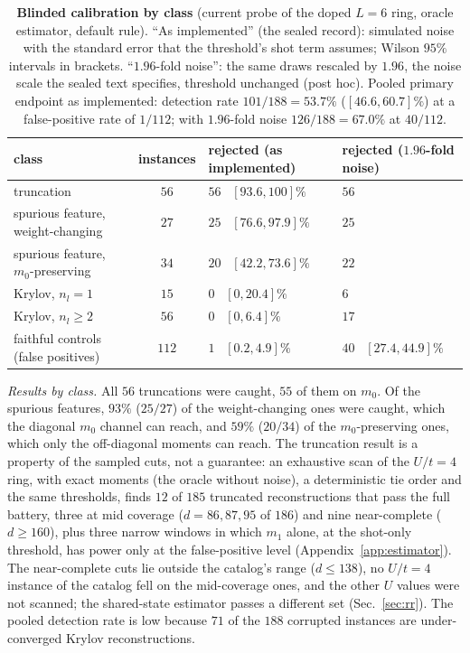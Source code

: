 \documentclass[submission, PhysCore]{SciPost}
\begin{document}
\begin{table}[t]
\caption{\label{tab:blind}\textbf{Blinded calibration by class} (current probe of the doped $L=6$ ring, oracle estimator, default rule). ``As implemented'' (the sealed record): simulated noise with the standard error that the threshold's shot term assumes; Wilson $95\%$ intervals in brackets. ``$1.96$-fold noise'': the same draws rescaled by $1.96$, the noise scale the sealed text specifies, threshold unchanged (post hoc). Pooled primary endpoint as implemented: detection rate $101/188=53.7\%$ ($[46.6,60.7]\%$) at a false-positive rate of $1/112$; with $1.96$-fold noise $126/188=67.0\%$ at $40/112$.}
\small
\begin{tabular}{>{\raggedright\arraybackslash}p{}c>{\raggedright\arraybackslash}p{}>{\raggedright\arraybackslash}p{}}
\toprule
class & instances & rejected (as implemented) & rejected ($1.96$-fold noise) \tabularnewline
\midrule
truncation & $56$ & $56$ \ $[93.6,100]\%$ & $56$ \tabularnewline
spurious feature, weight-changing & $27$ & $25$ \ $[76.6,97.9]\%$ & $25$ \tabularnewline
spurious feature, $m_0$-preserving & $34$ & $20$ \ $[42.2,73.6]\%$ & $22$ \tabularnewline
Krylov, $n_l=1$ & $15$ & $0$ \ $[0,20.4]\%$ & $6$ \tabularnewline
Krylov, $n_l\ge2$ & $56$ & $0$ \ $[0,6.4]\%$ & $17$ \tabularnewline
\midrule
faithful controls (false positives) & $112$ & $1$ \ $[0.2,4.9]\%$ & $40$ \ $[27.4,44.9]\%$ \tabularnewline
\bottomrule
\end{tabular}
\end{table}

\emph{Results by class.} All $56$ truncations were caught, $55$ of them on $m_0$. Of the spurious features, $93\%$ ($25/27$) of the weight-changing ones were caught, which the diagonal $m_0$ channel can reach, and $59\%$ ($20/34$) of the $m_0$-preserving ones, which only the off-diagonal moments can reach. The truncation result is a property of the sampled cuts, not a guarantee: an exhaustive scan of the $U/t=4$ ring, with exact moments (the oracle without noise), a deterministic tie order and the same thresholds, finds $12$ of $185$ truncated reconstructions that pass the full battery, three at mid coverage ($d=86,87,95$ of $186$) and nine near-complete ($d\ge160$), plus three narrow windows in which $m_1$ alone, at the shot-only threshold, has power only at the false-positive level (Appendix~\ref{app:estimator}). The near-complete cuts lie outside the catalog's range ($d\le138$), no $U/t=4$ instance of the catalog fell on the mid-coverage ones, and the other $U$ values were not scanned; the shared-state estimator passes a different set (Sec.~\ref{sec:rr}). The pooled detection rate is low because $71$ of the $188$ corrupted instances are under-converged Krylov reconstructions.
\end{document}
